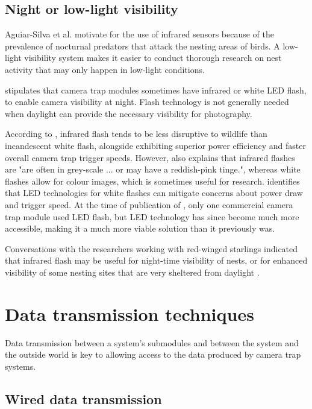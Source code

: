 \documentclass[class=report,11pt,crop=false]{standalone}
\begin{document}
\subsection{Night or low-light visibility}

Aguiar-Silva et al. \cite{aguiar-silva2017camera} motivate for the use of infrared sensors because of the prevalence of nocturnal predators that attack the nesting areas of birds. A low-light visibility system makes it easier to conduct thorough research on nest activity that may only happen in low-light conditions.

\cite{rovero2013which} stipulates that camera trap modules sometimes have infrared or white LED flash, to enable camera visibility at night. Flash technology is not generally needed when daylight can provide the necessary visibility for photography.

According to \cite{meek2012introduction}, infrared flash tends to be less disruptive to wildlife than incandescent white flash, alongside exhibiting superior power efficiency and faster overall camera trap trigger speeds. However, \cite{meek2012introduction} also explains that infrared flashes are "are often in grey-scale ... or may have a reddish-pink tinge.", whereas white flashes allow for colour images, which is sometimes useful for research. \cite{meek2012introduction} identifies that LED technologies for white flashes can mitigate concerns about power draw and trigger speed. At the time of publication of \cite{meek2012introduction}, only one commercial camera trap module used LED flash, but LED technology has since become much more accessible, making it a much more viable solution than it previously was.

Conversations with the researchers working with red-winged starlings indicated that infrared flash may be useful for night-time visibility of nests, or for enhanced visibility of some nesting sites that are very sheltered from daylight \cite{hofmeyer2024private}.


\section{Data transmission techniques}

Data transmission between a system's submodules and between the system and the outside world is key to allowing access to the data produced by camera trap systems.

\subsection{Wired data transmission}
\end{document}
